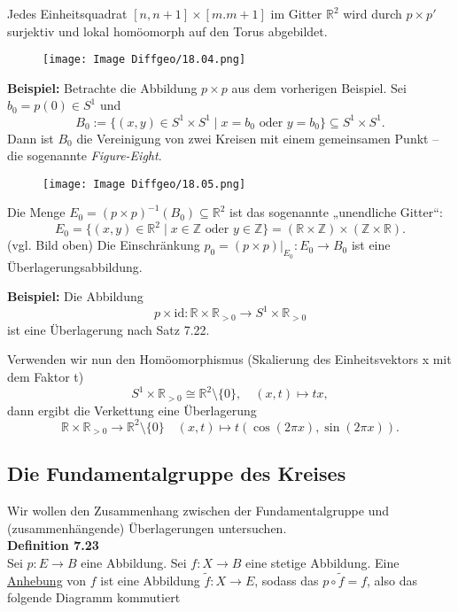 \documentclass[fleqn, 12pt, letterpaper]{article}
\begin{document}
Jedes Einheitsquadrat $[n,n+1]\times [m.m+1]$ im Gitter \( \mathbb{R}^2 \) wird durch \( p \times p' \) surjektiv und lokal homöomorph auf den Torus abgebildet.
 \begin{figure}[H]
    \centering
    \texttt{[image: Image Diffgeo/18.04.png]}
 \end{figure}

\textbf{Beispiel:} Betrachte die Abbildung \( p \times p \) aus dem vorherigen Beispiel. Sei \( b_0 = p(0) \in S^1 \) und
\[
B_0 := \{(x,y) \in S^1 \times S^1 \mid x = b_0 \text{ oder } y = b_0\} \subseteq S^1 \times S^1.
\]
Dann ist \( B_0 \) die Vereinigung von zwei Kreisen mit einem gemeinsamen Punkt – die sogenannte \textit{Figure-Eight}.
 \begin{figure}[H]
    \centering
    \texttt{[image: Image Diffgeo/18.05.png]}
 \end{figure}

Die Menge \( E_0 = (p \times p)^{-1}(B_0) \subseteq \mathbb{R}^2 \) ist das sogenannte „unendliche Gitter“:
\[
E_0 = \{(x,y) \in \mathbb{R}^2 \mid x \in \mathbb{Z} \text{ oder } y \in \mathbb{Z} \}=(\mathbb{R}\times \mathbb{Z})\times(\mathbb{Z}\times \mathbb{R}).
\]
(vgl. Bild oben) Die Einschränkung \( p_0 = (p \times p)|_{E_0}:E_0\rightarrow B_0 \) ist eine {Überlagerungsabbildung}.

\vspace{1em}
\textbf{Beispiel:} Die Abbildung
\[
p \times \mathrm{id} : \mathbb{R} \times \mathbb{R}_{>0} \longrightarrow S^1 \times \mathbb{R}_{>0}
\]
ist eine {Überlagerung} nach Satz 7.22.

Verwenden wir nun den Homöomorphismus (Skalierung des Einheitsvektors x mit dem Faktor t)
\[
S^1 \times \mathbb{R}_{>0} \cong \mathbb{R}^2 \setminus \{0\}, \quad (x,t) \mapsto tx,
\]
dann ergibt die Verkettung eine Überlagerung
\[
\mathbb{R} \times \mathbb{R}_{>0} \longrightarrow \mathbb{R}^2 \setminus \{0\} \quad (x,t)\mapsto t(\cos(2\pi x), \sin(2\pi x)).
\]


\subsection{Die Fundamentalgruppe des Kreises}
Wir wollen den Zusammenhang zwischen der Fundamentalgruppe und (zusammenhängende) Überlagerungen untersuchen.\\

\textbf{Definition 7.23} \\
Sei \( p : E \to B \) eine Abbildung. Sei \( f : X \to B \) eine stetige Abbildung. Eine \underline{Anhebung} von \( f \) ist eine Abbildung \( \tilde{f} : X \to E \), sodass das $p\circ\tilde{f}=f$, also das folgende Diagramm kommutiert
\end{document}
